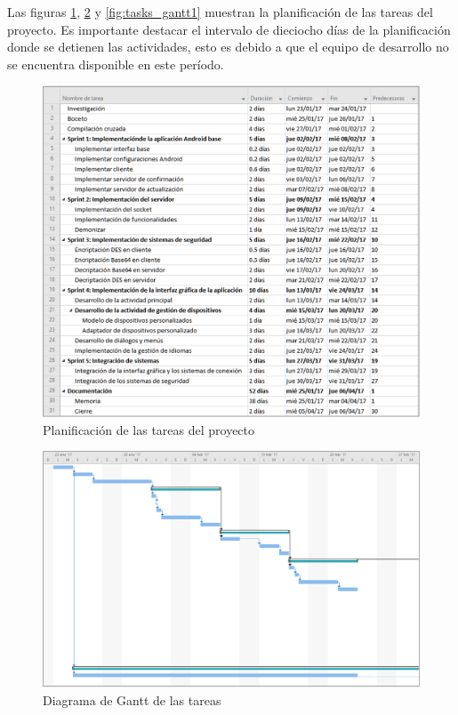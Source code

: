 \documentclass[12pt]{article}
\begin{document}
        Las figuras \ref{fig:tasks}, \ref{fig:tasks_gantt0} y \ref{fig:tasks_gantt1} muestran la planificación de las tareas del proyecto. Es importante destacar el intervalo de dieciocho días de la planificación donde se detienen las actividades, esto es debido a que el equipo de desarrollo no se encuentra disponible en este período.

        \begin{figure}[h!]
            \centering
                \includegraphics[scale=0.7]{tasks.eps}
                \caption{Planificación de las tareas del proyecto}
                \label{fig:tasks}
        \end{figure}

        \begin{figure}[h!]
            \centering
                \includegraphics[scale=0.5]{tasks_gantt0.eps}
                \caption{Diagrama de Gantt de las tareas}
                \label{fig:tasks_gantt0}
        \end{figure}
\end{document}
